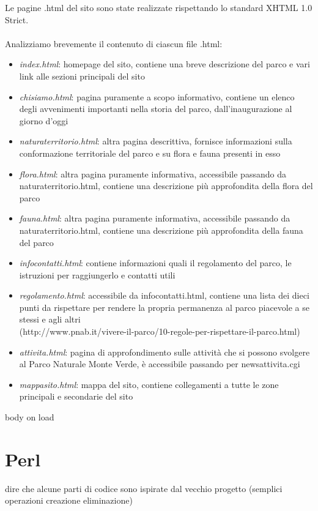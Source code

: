 \documentclass[12pt]{article}
\begin{document}
Le pagine .html del sito sono state realizzate rispettando lo standard XHTML 1.0 Strict.\\ \\
Analizziamo brevemente il contenuto di ciascun file .html:
\begin{itemize}
\item \textit{index.html}: homepage del sito, contiene una breve descrizione del parco e vari link alle sezioni principali del sito
\item \textit{chisiamo.html}:  pagina puramente a scopo informativo, contiene un elenco degli avvenimenti importanti nella storia del parco, dall'inaugurazione al giorno d'oggi
\item \textit{naturaterritorio.html}:  altra pagina descrittiva, fornisce informazioni sulla conformazione territoriale del parco e su flora e fauna presenti in esso
\item \textit{flora.html}: altra pagina puramente informativa, accessibile passando da naturaterritorio.html, contiene una descrizione più approfondita della flora del parco
\item \textit{fauna.html}: altra pagina puramente informativa, accessibile passando da naturaterritorio.html, contiene una descrizione più approfondita della fauna del parco
\item \textit{infocontatti.html}: contiene informazioni quali il regolamento del parco, le istruzioni per raggiungerlo e contatti utili
\item \textit{regolamento.html}: accessibile da infocontatti.html, contiene una lista dei dieci punti da rispettare per rendere la propria permanenza al parco piacevole a se stessi e agli altri\\ (http://www.pnab.it/vivere-il-parco/10-regole-per-rispettare-il-parco.html)
\item \textit{attivita.html}: pagina di approfondimento sulle attività che si possono svolgere al Parco Naturale Monte Verde, è accessibile passando per newsattivita.cgi
\item \textit{mappasito.html}: mappa del sito, contiene collegamenti a tutte le zone principali e secondarie del sito
\end{itemize}
body on load

			\section{Perl} dire che alcune parti di codice sono ispirate dal vecchio progetto (semplici operazioni creazione eliminazione)
		
\end{document}
